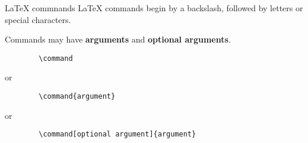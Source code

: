 \begin{frame}[fragile]{LaTeX commnands}
    LaTeX commands begin by a backslash, followed by letters or special characters.

    Commands may have \textbf{arguments} and \textbf{optional arguments}.

    \begin{verbatim}
        \command
    \end{verbatim}
    or
    \begin{verbatim}
        \command{argument}
    \end{verbatim}
    or
    \begin{verbatim}
        \command[optional argument]{argument}
    \end{verbatim}

\end{frame}